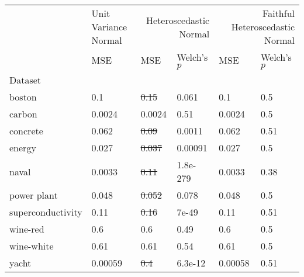 \begin{tabular}{l|l|ll|ll}
\toprule
 & Unit Variance Normal & \multicolumn{2}{r}{Heteroscedastic Normal} & \multicolumn{2}{r}{Faithful Heteroscedastic Normal} \\
 & MSE & MSE & Welch's $p$ & MSE & Welch's $p$ \\
Dataset &  &  &  &  &  \\
\midrule
boston & 0.1 & \sout{0.15} & 0.061 & 0.1 & 0.5 \\
carbon & 0.0024 & 0.0024 & 0.51 & 0.0024 & 0.5 \\
concrete & 0.062 & \sout{0.09} & 0.0011 & 0.062 & 0.51 \\
energy & 0.027 & \sout{0.037} & 0.00091 & 0.027 & 0.5 \\
naval & 0.0033 & \sout{0.11} & 1.8e-279 & 0.0033 & 0.38 \\
power plant & 0.048 & \sout{0.052} & 0.078 & 0.048 & 0.5 \\
superconductivity & 0.11 & \sout{0.16} & 7e-49 & 0.11 & 0.51 \\
wine-red & 0.6 & 0.6 & 0.49 & 0.6 & 0.5 \\
wine-white & 0.61 & 0.61 & 0.54 & 0.61 & 0.5 \\
yacht & 0.00059 & \sout{0.4} & 6.3e-12 & 0.00058 & 0.51 \\
\bottomrule
\end{tabular}
